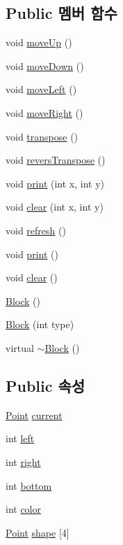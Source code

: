 \subsection*{Public 멤버 함수}
\begin{DoxyCompactItemize}
\item 
void \hyperlink{class_block_a8bf4fce7b2b837fd49726b6a7f17f4b0}{move\+Up} ()
\item 
void \hyperlink{class_block_a947d677f5229eabb9ceb291e3552773d}{move\+Down} ()
\item 
void \hyperlink{class_block_af304df3662f2c6feec7cfc232246ef29}{move\+Left} ()
\item 
void \hyperlink{class_block_a13d1f87524fed8d686a4d478e41d5096}{move\+Right} ()
\item 
void \hyperlink{class_block_a9cc446ec51a125982c41e67af63059b0}{transpose} ()
\item 
void \hyperlink{class_block_a18bfe78145650d1b13267000feea278b}{revers\+Transpose} ()
\item 
void \hyperlink{class_block_a6735096bf1a9678a688b98782bd1b226}{print} (int x, int y)
\item 
void \hyperlink{class_block_a5ea55096829ff27961b989409283cd86}{clear} (int x, int y)
\item 
void \hyperlink{class_block_a24e9792df444cc3cd9cd9c28a62f5abd}{refresh} ()
\item 
void \hyperlink{class_block_a7ea913786e48c140a2a35ff03c35746c}{print} ()
\item 
void \hyperlink{class_block_ab2f8596ed64d7d4fc1ce6cbd739173de}{clear} ()
\item 
\hyperlink{class_block_a37658a946bf5067ad01d68d9ff086adc}{Block} ()
\item 
\hyperlink{class_block_a991643bd8dd22fc349c55b0aa7dcded3}{Block} (int type)
\item 
virtual \hyperlink{class_block_a19d1bd0e1cef6a865ed2745a2e648405}{$\sim$\+Block} ()
\end{DoxyCompactItemize}
\subsection*{Public 속성}
\begin{DoxyCompactItemize}
\item 
\hyperlink{struct_point}{Point} \hyperlink{class_block_aeb5dd312b719966752ba4b38720a4535}{current}
\item 
int \hyperlink{class_block_a1e4846853623ef67785a1bae5cec623e}{left}
\item 
int \hyperlink{class_block_a370e4fb56e296b92eb2cc3916b3f39b2}{right}
\item 
int \hyperlink{class_block_a8d97d8b0b6a09592ac007c13c3fa3867}{bottom}
\item 
int \hyperlink{class_block_a11fa34418f20b6613d0ceeea8fc71d25}{color}
\item 
\hyperlink{struct_point}{Point} \hyperlink{class_block_ae1a4e97236e1e5f04d21fc9227b8c3a8}{shape} \mbox{[}4\mbox{]}
\end{DoxyCompactItemize}

